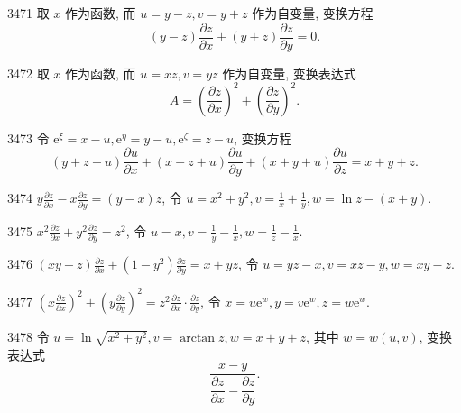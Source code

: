 \begin{prob}[M]{3471}
取 $x$ 作为函数, 而 $u = y-z, v = y+z$ 作为自变量, 变换方程
\[
(y-z)\frac{\partial z}{\partial x} + (y+z)\frac{\partial z}{\partial y} = 0.
\]
\end{prob}

\begin{prob}[M]{3472}
取 $x$ 作为函数, 而 $u = xz, v = yz$ 作为自变量, 变换表达式
\[
A = \left(\frac{\partial z}{\partial x}\right)^2 + \left(\frac{\partial z}{\partial y}\right)^2.
\]
\end{prob}

\begin{prob}[M]{3473}
令 $\mathrm{e}^{\xi} = x - u, \mathrm{e}^{\eta} = y - u, \mathrm{e}^{\zeta} = z - u$, 变换方程
\[
(y+z+u)\frac{\partial u}{\partial x} + (x+z+u)\frac{\partial u}{\partial y} + (x+y+u)\frac{\partial u}{\partial z} = x+y+z.
\]
\end{prob}


\begin{prob}[S]{3474}
$y\frac{\partial z}{\partial x} - x\frac{\partial z}{\partial y} = (y-x)z$, 令 $u = x^2+y^2, v = \frac{1}{x} + \frac{1}{y}, w = \ln z - (x+y)$.
\end{prob}

\begin{prob}[S]{3475}
$x^2\frac{\partial z}{\partial x} + y^2\frac{\partial z}{\partial y} = z^2$, 令 $u = x, v = \frac{1}{y} - \frac{1}{x}, w = \frac{1}{z} - \frac{1}{x}$.
\end{prob}

\begin{prob}[S]{3476}
$(xy+z)\frac{\partial z}{\partial x} + (1-y^2)\frac{\partial z}{\partial y} = x+yz$, 令 $u = yz-x, v = xz-y, w = xy-z$.
\end{prob}

\begin{prob}[S]{3477}
$\left(x\frac{\partial z}{\partial x}\right)^2 + \left(y\frac{\partial z}{\partial y}\right)^2 = z^2 \frac{\partial z}{\partial x}\cdot\frac{\partial z}{\partial y}$, 令 $x = u\mathrm{e}^w, y = v\mathrm{e}^w, z = w\mathrm{e}^w$.
\end{prob}

\begin{prob}[M]{3478}
令 $u = \ln\sqrt{x^2+y^2}, v = \arctan z, w = x+y+z$, 其中 $w = w(u, v)$, 变换表达式
\[
\frac{x-y}{\dfrac{\partial z}{\partial x} - \dfrac{\partial z}{\partial y}}.
\]
\end{prob}

